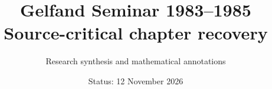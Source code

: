 \documentclass[11pt,a4paper,oneside]{book}
\title{Gelfand Seminar 1983--1985\\Source-critical chapter recovery}
\author{Research synthesis and mathematical annotations}
\date{Status: 12 November 2026}
\theoremstyle{definition}
\theoremstyle{remark}
\begin{document}
\maketitle
\tableofcontents

\nocite{*}


\end{document}
